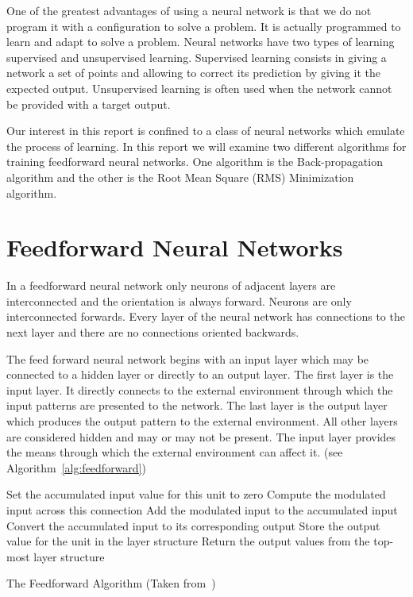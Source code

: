 \documentclass[11pt]{article}
\begin{document}
One of the greatest advantages of using a neural network is that we do not program it with a configuration to solve a problem. It is
actually programmed to learn and adapt to solve a problem. Neural networks have two types of learning supervised and unsupervised
learning. Supervised learning consists in giving a network a set of points and allowing to correct its prediction by giving it the
expected output. Unsupervised learning is often used when the network cannot be provided with a target output.

Our interest in this report is confined to a class of neural networks which emulate the process of learning. In this report we will
examine two different algorithms for training feedforward neural networks. One algorithm is the Back-propagation algorithm and the other
is the Root Mean Square (RMS) Minimization algorithm.

\section{Feedforward Neural Networks} %
\label{sec:feedforward_neural_networks}

In a feedforward neural network only neurons of adjacent layers are interconnected and the orientation is always forward. Neurons are
only interconnected forwards. Every layer of the neural network has connections to the next layer and there are no connections oriented
backwards.

The feed forward neural network begins with an input layer which may be connected to a hidden layer or directly to an output layer. The
first layer is the input layer. It directly connects to the external environment through which the input patterns are presented to the
network. The last layer is the output layer which produces the output pattern to the external environment. All other layers are
considered hidden and may or may not be present. The input layer provides the means through which the external environment can
affect it. (see Algorithm~\ref{alg:feedforward})

\begin{algorithm}%
\SetLine
{}
{
	{
		Set the accumulated input value for this unit to zero\;
			{
				Compute the modulated input across this connection\;
				Add the modulated input to the accumulated input\;
			}
		Convert the accumulated input to its corresponding output\;
		Store the output value for the unit in the layer structure\;
	}
	Return the output values from the top-most layer structure\;
}

\caption{The Feedforward Algorithm (Taken from~\cite{skapura})}
\label{alg:feedforward}
\end{algorithm}
\end{document}
